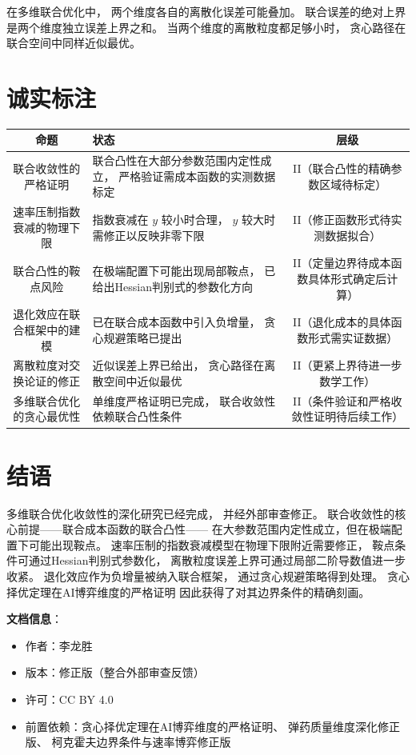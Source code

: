 \documentclass[11pt,a4paper]{article}
\begin{document}
在多维联合优化中，
两个维度各自的离散化误差可能叠加。
联合误差的绝对上界是两个维度独立误差上界之和。
当两个维度的离散粒度都足够小时，
贪心路径在联合空间中同样近似最优。

\section{诚实标注}

\begin{center}
\begin{xltabular}{\textwidth}{c|X|c}
\toprule
\textbf{命题} & \textbf{状态} & \textbf{层级} \\
\midrule
联合收敛性的严格证明 &
联合凸性在大部分参数范围内定性成立，
严格验证需成本函数的实测数据标定 &
II（联合凸性的精确参数区域待标定） \\
速率压制指数衰减的物理下限 &
指数衰减在 \(y\) 较小时合理，
\(y\) 较大时需修正以反映非零下限 &
II（修正函数形式待实测数据拟合） \\
联合凸性的鞍点风险 &
在极端配置下可能出现局部鞍点，
已给出Hessian判别式的参数化方向 &
II（定量边界待成本函数具体形式确定后计算） \\
退化效应在联合框架中的建模 &
已在联合成本函数中引入负增量，
贪心规避策略已提出 &
II（退化成本的具体函数形式需实证数据） \\
离散粒度对交换论证的修正 &
近似误差上界已给出，
贪心路径在离散空间中近似最优 &
II（更紧上界待进一步数学工作） \\
多维联合优化的贪心最优性 &
单维度严格证明已完成，
联合收敛性依赖联合凸性条件 &
II（条件验证和严格收敛性证明待后续工作） \\
\bottomrule
\end{xltabular}
\end{center}

\section{结语}

多维联合优化收敛性的深化研究已经完成，
并经外部审查修正。
联合收敛性的核心前提——联合成本函数的联合凸性——
在大参数范围内定性成立，但在极端配置下可能出现鞍点。
速率压制的指数衰减模型在物理下限附近需要修正，
鞍点条件可通过Hessian判别式参数化，
离散粒度误差上界可通过局部二阶导数值进一步收紧。
退化效应作为负增量被纳入联合框架，
通过贪心规避策略得到处理。
贪心择优定理在AI博弈维度的严格证明
因此获得了对其边界条件的精确刻画。

\vspace{5mm}
\noindent\textbf{文档信息}：
\begin{itemize}
    \item 作者：李龙胜
    \item 版本：修正版（整合外部审查反馈）
    \item 许可：CC BY 4.0
    \item 前置依赖：贪心择优定理在AI博弈维度的严格证明、
          弹药质量维度深化修正版、
          柯克霍夫边界条件与速率博弈修正版
\end{itemize}
\end{document}
